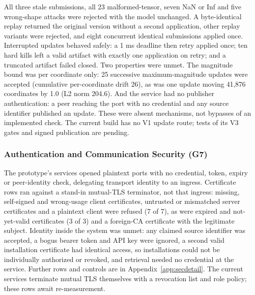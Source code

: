 \documentclass[sigconf]{acmart}
\theoremstyle{acmdefinition}\newtheorem{property}{Property}
\newcommand{\pendingStageThirteen}[1]{#1}
\begin{document}
All three stale submissions, all 23 malformed-tensor, seven NaN or Inf and five wrong-shape attacks were rejected with the model unchanged. A byte-identical replay returned the original version without a second application, other replay variants were rejected, and eight concurrent identical submissions applied once. Interrupted updates behaved safely: a 1 ms deadline then retry applied once; ten hard kills left a valid artifact with exactly one application on retry; and a truncated artifact failed closed. Two properties were unmet. The magnitude bound was per coordinate only: 25 successive maximum-magnitude updates were accepted (cumulative per-coordinate drift 26), as was one update moving 41,876 coordinates by 1.0 (L2 norm 204.6). And the service had no publisher authentication: a peer reaching the port with no credential and any source identifier published an update. These were absent mechanisms, not bypasses of an implemented check. \pendingStageThirteen{The current build has no V1 update route; tests of its V3 gates and signed publication are pending.}

\subsubsection{Authentication and Communication Security (G7)}
\label{sec:eval_auth}
The prototype's services opened plaintext ports with no credential, token, expiry or peer-identity check, delegating transport identity to an ingress. Certificate rows ran against a stand-in mutual-TLS terminator, not that ingress: missing, self-signed and wrong-usage client certificates, untrusted or mismatched server certificates and a plaintext client were refused (7 of 7), as were expired and not-yet-valid certificates (3 of 3) and a foreign-CA certificate with the legitimate subject. Identity inside the system was unmet: any claimed source identifier was accepted, a bogus bearer token and API key were ignored, a second valid installation certificate had identical access, so installations could not be individually authorized or revoked, and retrieval needed no credential at the service. Further rows and controls are in Appendix~\ref{app:secdetail}. \pendingStageThirteen{The current services terminate mutual TLS themselves with a revocation list and role policy; these rows await re-measurement.}
\end{document}
